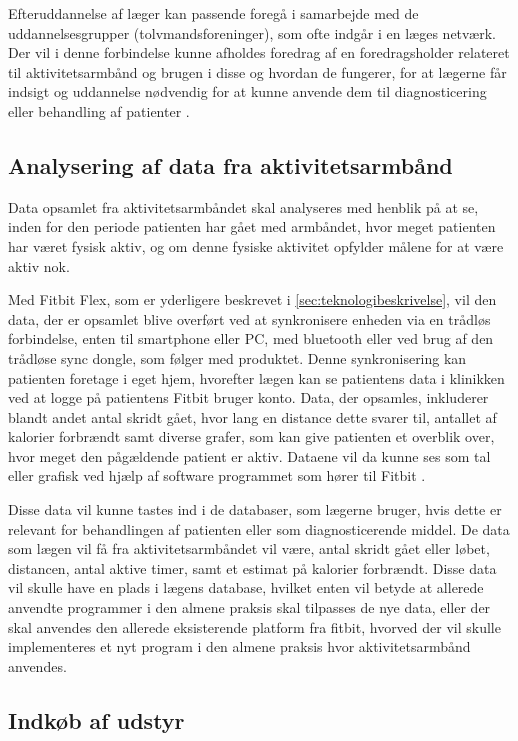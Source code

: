 Efteruddannelse af læger kan passende foregå i samarbejde med de uddannelsesgrupper (tolvmandsforeninger), som ofte indgår i en læges netværk. Der vil i denne forbindelse kunne afholdes foredrag af en foredragsholder relateret til aktivitetsarmbånd og brugen i disse og hvordan de fungerer, for at lægerne får indsigt og uddannelse nødvendig for at kunne anvende dem til diagnosticering eller behandling af patienter \citep{vedsted2005}. 

\subsection{Analysering af data fra aktivitetsarmbånd}  
Data opsamlet fra aktivitetsarmbåndet skal analyseres med henblik på at se, inden for den periode patienten har gået med armbåndet, hvor meget patienten har været fysisk aktiv, og om denne fysiske aktivitet opfylder målene for at være aktiv nok.  

Med Fitbit Flex, som er yderligere beskrevet i \autoref{sec:teknologibeskrivelse}, vil den data, der er opsamlet blive overført ved at synkronisere enheden via en trådløs forbindelse, enten til smartphone eller PC, med bluetooth eller ved brug af den trådløse sync dongle, som følger med produktet. Denne synkronisering kan patienten foretage i eget hjem, hvorefter lægen kan se patientens data i klinikken ved at logge på patientens Fitbit bruger konto. Data, der opsamles, inkluderer blandt andet antal skridt gået, hvor lang en distance dette svarer til, antallet af kalorier forbrændt samt diverse grafer, som kan give patienten et overblik over, hvor meget den pågældende patient er aktiv. Dataene vil da kunne ses som tal eller grafisk ved hjælp af software programmet som hører til Fitbit \citep{fitbitflex}. 

Disse data vil kunne tastes ind i de databaser, som lægerne bruger, hvis dette er relevant for behandlingen af patienten eller som diagnosticerende middel. De data som lægen vil få fra aktivitetsarmbåndet vil være, antal skridt gået eller løbet, distancen, antal aktive timer, samt et estimat på kalorier forbrændt. Disse data vil skulle have en plads i lægens database, hvilket enten vil betyde at allerede anvendte programmer i den almene praksis skal tilpasses de nye data, eller der skal anvendes den allerede eksisterende platform fra fitbit, hvorved der vil skulle implementeres et nyt program i den almene praksis hvor aktivitetsarmbånd anvendes. 

\subsection{Indkøb af udstyr}	

